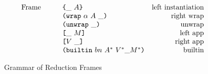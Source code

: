 \documentclass[../main.tex]{subfiles}
\begin{document}
\begin{figure*}[t]
    \centering
    \[\begin{array}{lrclr}
        \textrm{Frame} &   &     & \texttt{\{}\_ ~ A\texttt{\}}                     & \textrm{left instantiation}\\
                       &   &     & \texttt{(} \texttt{wrap} ~ \alpha ~ A ~ \_ \texttt{)}            & \textrm{right wrap}\\
                       &   &     & \texttt{(} \texttt{unwrap} ~ \_ \texttt{)}{}                        & \textrm{unwrap}\\
                       &   &     & \texttt{[} \_ ~ M \texttt{]}                      & \textrm{left app}\\
                       &   &     & \texttt{[} V ~ \_ \texttt{]}                     & \textrm{right app}\\
                       &   &     & \texttt{(} \texttt{builtin} ~ bn ~ A^* ~ V^* \_ M^* \texttt{)}        & \textrm{builtin}\\
    \end{array}\]
    \caption{Grammar of Reduction Frames}
    \label{fig:Plutus_core_reduction_frames}
\end{figure*}
\end{document}
